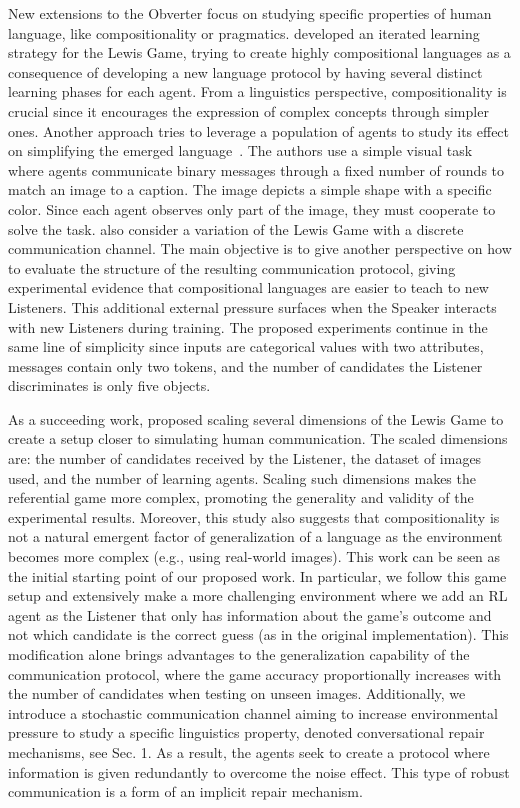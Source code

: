 New extensions to the Obverter focus on studying specific properties of human language, like compositionality or pragmatics. \citet{Ren2020Compositional} developed an iterated learning strategy for the Lewis Game, trying to create highly compositional languages as a consequence of developing a new language protocol by having several distinct learning phases for each agent. From a linguistics perspective, compositionality is crucial since it encourages the expression of complex concepts through simpler ones. Another approach tries to leverage a population of agents to study its effect on simplifying the emerged language~\citep{graesser2019emergent}. The authors use a simple visual task where agents communicate binary messages through a fixed number of rounds to match an image to a caption. The image depicts a simple shape with a specific color. Since each agent observes only part of the image, they must cooperate to solve the task. \citet{NEURIPS2019_b0cf188d} also consider a variation of the Lewis Game with a discrete communication channel. The main objective is to give another perspective on how to evaluate the structure of the resulting communication protocol, giving experimental evidence that compositional languages are easier to teach to new Listeners. This additional external pressure surfaces when the Speaker interacts with new Listeners during training. The proposed experiments continue in the same line of simplicity since inputs are categorical values with two attributes, messages contain only two tokens, and the number of candidates the Listener discriminates is only five objects.

As a succeeding work, \citet{chaabouni2022emergent} proposed scaling several dimensions of the Lewis Game to create a setup closer to simulating human communication. The scaled dimensions are: the number of candidates received by the Listener, the dataset of images used, and the number of learning agents. Scaling such dimensions makes the referential game more complex, promoting the generality and validity of the experimental results. Moreover, this study also suggests that compositionality is not a natural emergent factor of generalization of a language as the environment becomes more complex (e.g., using real-world images). This work can be seen as the initial starting point of our proposed work. In particular, we follow this game setup and extensively make a more challenging environment where we add an RL agent as the Listener that only has information about the game's outcome and not which candidate is the correct guess (as in the original implementation). This modification alone brings advantages to the generalization capability of the communication protocol, where the game accuracy proportionally increases with the number of candidates when testing on unseen images. Additionally, we introduce a stochastic communication channel aiming to increase environmental pressure to study a specific linguistics property, denoted conversational repair mechanisms, see Sec. 1. As a result, the agents seek to create a protocol where information is given redundantly to overcome the noise effect. This type of robust communication is a form of an implicit repair mechanism.

